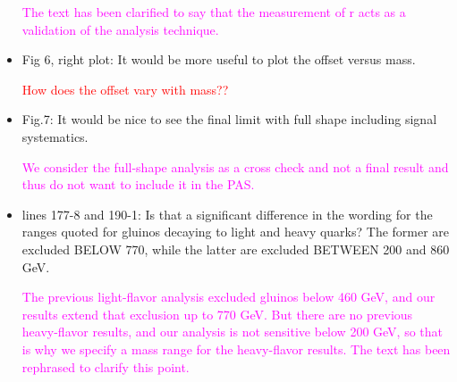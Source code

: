 \documentclass[paper=a4, fontsize=11pt]{scrartcl}
\begin{document}
\begin{itemize}
\textcolor{magenta}{The text has been clarified to say that the measurement
of r acts as a validation of the analysis technique.}\\

\item Fig 6, right plot: It would be more useful to plot the offset versus mass.

\textcolor{red}{How does the offset vary with mass??}\\

\item Fig.7: It would be nice to see the final limit with full shape including signal systematics.

\textcolor{magenta}{We consider the full-shape analysis as a cross check and not a final
result and thus do not want to include it in the PAS.}\\

\item lines 177-8 and 190-1: Is that a significant difference in the wording for the ranges quoted for gluinos decaying to light and heavy quarks? The former are excluded BELOW 770, while the latter are excluded BETWEEN 200 and 860 GeV.

\textcolor{magenta}{The previous light-flavor analysis excluded gluinos below 460 GeV, and our
results extend that exclusion up to 770 GeV. But there are no previous heavy-flavor results,
and our analysis is not sensitive below 200 GeV, so that is why we specify a mass range for
the heavy-flavor results. The text has been rephrased to clarify this point.}\\

\end{itemize}
\end{document}
